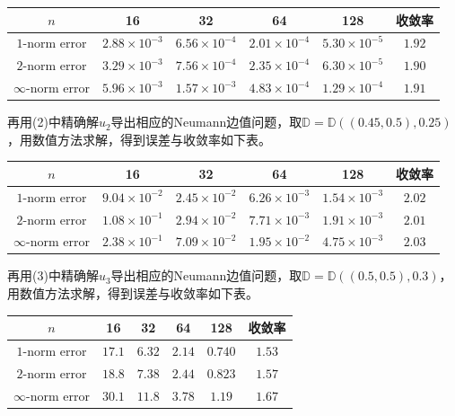 \documentclass[lang=cn,11pt,a4paper]{elegantpaper}
\begin{document}
\begin{table}[H]
  \centering
  \begin{tabular}{c|cccc|c}
  \textbf{$n$}        & 16                   & 32                   & 64                   & 128                  & 收敛率 \\ \hline
  $1$-norm error      & $2.88\times 10^{-3}$ & $6.56\times 10^{-4}$ & $2.01\times 10^{-4}$ & $5.30\times 10^{-5}$ & $1.92$\\
  $2$-norm error      & $3.29\times 10^{-3}$ & $7.56\times 10^{-4}$ & $2.35\times 10^{-4}$ & $6.30\times 10^{-5}$ & $1.90$\\
  $\infty$-norm error & $5.96\times 10^{-3}$ & $1.57\times 10^{-3}$ & $4.83\times 10^{-4}$ & $1.29\times 10^{-4}$ & $1.91$
  \end{tabular}
\end{table}

再用(2)中精确解$u_2$导出相应的Neumann边值问题，取$\mathbb{D}=\mathbb{D}((0.45,0.5),0.25)$，用数值方法求解，得到误差与收敛率如下表。

\begin{table}[H]
  \centering
  \begin{tabular}{c|cccc|c}
  \textbf{$n$}        & 16                   & 32                   & 64                   & 128                  & 收敛率 \\ \hline
  $1$-norm error      & $9.04\times 10^{-2}$ & $2.45\times 10^{-2}$ & $6.26\times 10^{-3}$ & $1.54\times 10^{-3}$ & $2.02$\\
  $2$-norm error      & $1.08\times 10^{-1}$ & $2.94\times 10^{-2}$ & $7.71\times 10^{-3}$ & $1.91\times 10^{-3}$ & $2.01$\\
  $\infty$-norm error & $2.38\times 10^{-1}$ & $7.09\times 10^{-2}$ & $1.95\times 10^{-2}$ & $4.75\times 10^{-3}$ & $2.03$
  \end{tabular}
\end{table}

再用(3)中精确解$u_3$导出相应的Neumann边值问题，取$\mathbb{D}=\mathbb{D}((0.5,0.5),0.3)$，用数值方法求解，得到误差与收敛率如下表。

\begin{table}[H]
  \centering
  \begin{tabular}{c|cccc|c}
  \textbf{$n$}        & 16                   & 32                   & 64                   & 128                  & 收敛率 \\ \hline
  $1$-norm error      & $17.1$ & $6.32$ & $2.14$ & $0.740$ & $1.53$\\
  $2$-norm error      & $18.8$ & $7.38$ & $2.44$ & $0.823$ & $1.57$\\
  $\infty$-norm error & $30.1$ & $11.8$ & $3.78$ & $1.19$ & $1.67$
  \end{tabular}
\end{table}
\end{document}
